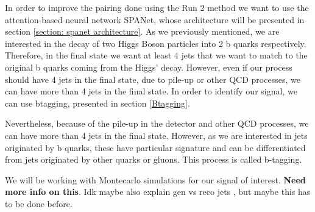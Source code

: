 In order to improve the pairing done using the Run 2 method we want to use the attention-based neural network SPANet, whose architecture will be presented in section \ref{section: spanet architecture}. As we previously mentioned, we are interested in the decay of two Higgs Boson particles into 2 b quarks respectively. Therefore, in the final state we want at least 4 jets that we want to match to the original b quarks coming from the Higgs' decay. However, even if our process should have 4 jets in the final state, due to pile-up or other QCD processes, we can have more than 4 jets in the final state. In order to identify our signal, we can use btagging, presented in section \ref{Btagging}.


Nevertheless, because of the pile-up in the detector and other QCD processes, we can have more than 4 jets in the final state. However, as we are interested in jets originated by b quarks, these have particular signature and can be differentiated from jets originated by other quarks or gluons. This process is called b-tagging.

We will be working with Montecarlo simulations for our signal of interest. \textbf{Need more info on this}. Idk maybe also explain gen vs reco jets , but maybe this has to be done before.
